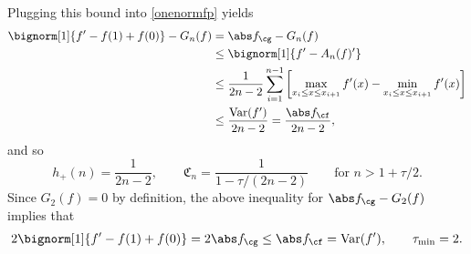 Plugging this bound into \eqref{onenormfp} yields
\begin{align*}
\bignorm[1]{f'-f(1)+f(0)} - G_n(f) &= \Gnorm{f} - G_{n}(f)\\
 & \le \bignorm[1]{f' -A_n(f)'}\\
&\le \frac{1}{2n-2} \sum_{i=1}^{n-1} \left[ \max_{x_i \le x \le x_{i+1}} f'(x) - \min_{x_i \le x \le x_{i+1}} f'(x) \right] \\
& \le \frac{\Var(f')}{2n-2} = \frac{\Fnorm{f}}{2n-2},
\end{align*}
and so
\begin{equation}\label{factor}
h_{+}(n)= \frac{1}{2n-2}, \qquad \mathfrak{C}_n =\frac{1}{1 - \tau/(2n-2)} \qquad \text{for } n>1+\tau/2.
\end{equation}
Since $G_2(f)=0$ by definition, the above inequality for $\Gnorm{f} - G_{2}(f)$ implies that
\begin{equation} \label{taumininteg}
2\bignorm[1]{f'-f(1)+f(0)} = 2 \Gnorm{f} \le \Fnorm{f} = \Var(f'), \qquad \tau_{\min}=2.
\end{equation}


